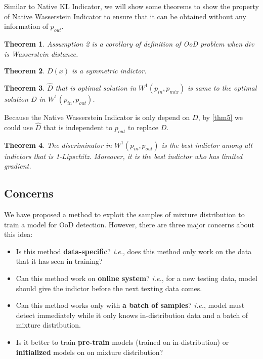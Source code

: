 \documentclass[letterpaper]{article} %
\newtheorem{theorem}{Theorem}
\newcommand{\IE}{\textit{i.e.}, }
\newcommand{\pin}{p_{in}}
\newcommand{\pout}{p_{out}}
\newcommand{\pmix}{p_{mix}}
\begin{document}
Similar to Native KL Indicator, we will show some theorems to show the property of Native Wasserstein Indicator to ensure that it can be obtained without any information of $\pout$. 

\begin{theorem}\label{thm6}
	Assumption 2 is a corollary of definition of OoD problem when $div$ is Wasserstein distance.  
\end{theorem}

\begin{theorem}\label{thm7}
	$D(x)$ is a symmetric indictor. 
\end{theorem}

\begin{theorem}\label{thm8}
	$\hat{D}$ that is optimal solution in $W^1(\pin, \pmix)$ is same to the optimal solution $D$ in $W^1(\pin, \pout)$. 
\end{theorem}

Because the Native Wasserstein Indicator is only depend on $D$, by \cref{thm5} we could use $\hat{D}$ that is independent to $\pout$ to replace $D$. 

\begin{theorem}\label{thm9}
	The discriminator in $W^1(\pin, \pout)$ is the best indictor among all indictors that is 1-Lipschitz. Moreover, it is the best indictor who has limited gradient. 
\end{theorem}

\subsection{Concerns}
We have proposed a method to exploit the samples of mixture distribution to train a model for OoD detection. However, there are three major concerns about this idea: 
\begin{itemize}
	\item Is this method \textbf{data-specific}? \IE does this method only work on the data that it has seen in training? 
	\item Can this method work on \textbf{online system}? \IE for a new testing data, model should give the indictor before the next texting data comes.  
	\item Can this method works only with \textbf{a batch of samples}? \IE model must detect immediately while it only knows in-distribution data and a batch of mixture distribution. 
	\item Is it better to train \textbf{pre-train} models (trained on in-distribution) or \textbf{initialized} models on on mixture distribution?
\end{itemize} 
\end{document}

